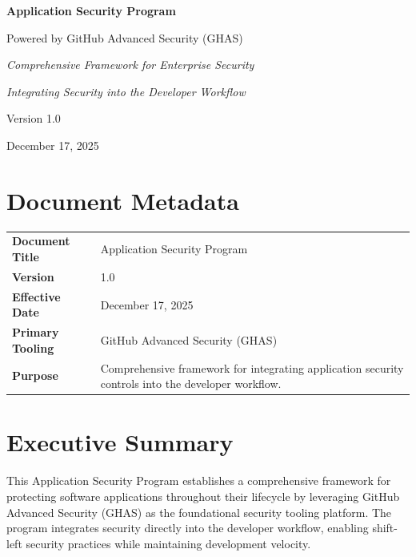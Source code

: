 \documentclass[11pt]{article}
\begin{document}
\hypersetup{pageanchor=false}%
\begin{titlepage}
\centering
\vspace*{1.5cm}
{\LARGE\bfseries Application Security Program\par}
\vspace{0.4cm}
{\Large Powered by GitHub Advanced Security (GHAS)\par}
\vspace{0.9cm}
{\large\itshape Comprehensive Framework for Enterprise Security\par}
\vspace{0.25em}
{\large\itshape Integrating Security into the Developer Workflow\par}
\vspace{0.25em}
\vfill
{\large Version 1.0\par}
{\large December 17, 2025\par}
\end{titlepage}\hypersetup{pageanchor=true}

\tableofcontents
\clearpage

\section*{Document Metadata}

\begin{tabular}{@{}p{}p{}@{}}
\toprule
\textbf{Document Title} & Application Security Program \\
\textbf{Version} & 1.0 \\
\textbf{Effective Date} & December 17, 2025 \\
\textbf{Primary Tooling} & GitHub Advanced Security (GHAS) \\
\textbf{Purpose} & Comprehensive framework for integrating application security controls into the developer workflow. \\
\bottomrule
\end{tabular}

\clearpage
{}
\section{Executive Summary}

This Application Security Program establishes a comprehensive framework for protecting software applications throughout their lifecycle by leveraging GitHub Advanced Security (GHAS) as the foundational security tooling platform. The program integrates security directly into the developer workflow, enabling shift-left security practices while maintaining development velocity.
\end{document}
